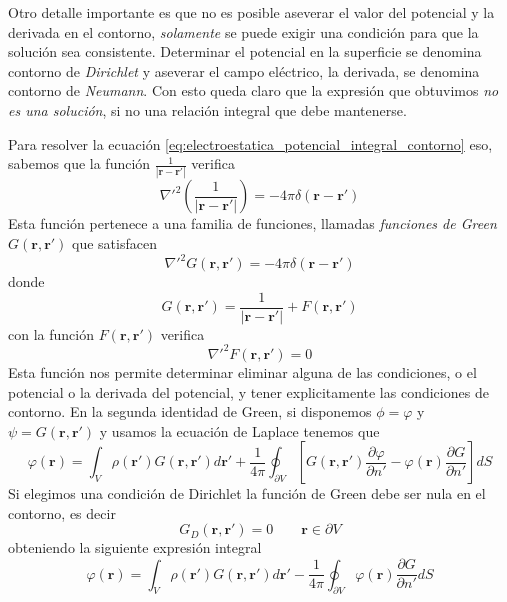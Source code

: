 \documentclass[a4paper]{article}
\numberwithin{equation}{section} %
\renewcommand{\vec}[1]{\boldsymbol{#1}}
\newcommand{\rinv}{\frac{1}{|\vec{r} - \vec{r}'|}}
\begin{document}
Otro detalle importante es que no es posible aseverar el valor del potencial y la derivada en el contorno, \emph{solamente} se puede exigir una condición para que la solución sea consistente. Determinar el potencial en la superficie se denomina contorno de \emph{Dirichlet} y aseverar el campo eléctrico, la derivada, se denomina contorno de \emph{Neumann}. Con esto queda claro que la expresión que obtuvimos \emph{no es una solución}, si no una relación integral que debe mantenerse.

Para resolver la ecuación \ref{eq:electroestatica_potencial_integral_contorno} eso, sabemos que la función $\rinv$ verifica 
\begin{equation}
	\nabla'^2 \left(\rinv\right) = -4\pi \delta(\vec{r} - \vec{r}')
\end{equation}
Esta función pertenece a una familia de funciones, llamadas \emph{funciones de Green} $G(\vec{r}, \vec{r}')$ que satisfacen
\begin{equation}
	\nabla'^2 G(\vec{r}, \vec{r}') = - 4\pi \delta(\vec{r} - \vec{r}')
\end{equation}
donde
\begin{equation}
	G(\vec{r}, \vec{r}') = \rinv + F(\vec{r}, \vec{r}')
\end{equation}
con la función $F(\vec{r},\vec{r}')$ verifica
\begin{equation}
	\nabla'^2 F(\vec{r}, \vec{r}') = 0
\end{equation}
Esta función nos permite determinar eliminar alguna de las condiciones, o el potencial o la derivada del potencial, y tener explicitamente las condiciones de contorno. En la segunda identidad de Green, si disponemos $\phi = \varphi$ y $\psi = G(\vec{r}, \vec{r}')$ y usamos la ecuación de Laplace tenemos que
\begin{equation}
	\varphi(\vec{r}) = \int_{V} \rho(\vec{r}') G(\vec{r}, \vec{r}') d\vec{r}' + \frac{1}{4\pi} \oint_{\partial V} \left[ G(\vec{r}, \vec{r}') \frac{\partial \varphi}{\partial n'} - \varphi(\vec{r}) \frac{\partial G}{\partial n'} \right]dS 
\end{equation}
Si elegimos una condición de Dirichlet la función de Green debe ser nula en el contorno, es decir
\begin{equation}
	G_{D}(\vec{r}, \vec{r}') = 0 \qquad \vec{r} \in \partial V
\end{equation}
obteniendo la siguiente expresión integral
\begin{equation}
		\varphi(\vec{r}) = \int_{V} \rho(\vec{r}') G(\vec{r}, \vec{r}') d\vec{r}' - \frac{1}{4\pi} \oint_{\partial V}  \varphi(\vec{r}) \frac{\partial G}{\partial n'} dS
		\label{eq:electroestatica_potencial_green_dirichlet}
\end{equation}
\end{document}
